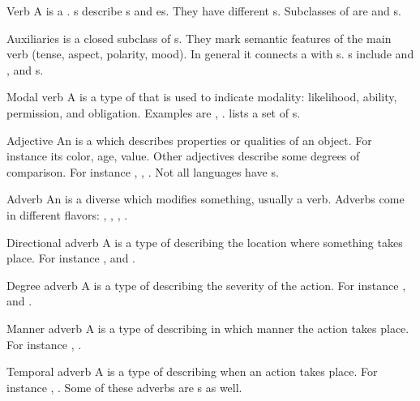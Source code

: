 \begin{df}{Verb}
A \sb{} is a . \sb{}s describe s and es. They have different s. Subclasses of \sb{} are  and s.
\end{df}
\begin{df}{Auxiliaries}
\sb{} is a closed subclass of s. They mark semantic features of the main verb (tense, aspect, polarity, mood). In general it connects a  with s. \sb{}s include  and ,  and s.
\end{df}
\begin{df}{Modal verb}
A \sb{} is a type of  that is used to indicate modality: likelihood, ability, permission, and obligation. Examples are , .  lists a set of \sb{}s.
\end{df}
\begin{df}{Adjective}
An \sb{} is a  which describes properties or qualities of an object. For instance its color, age, value. Other adjectives describe some degrees of comparison. For instance , , . Not all languages have \sb{}s.
\end{df}
\begin{df}{Adverb}
An \sb{} is a diverse  which modifies something, usually a verb. Adverbs come in different flavors: , , , .
\end{df}
\begin{df}{Directional adverb}
A \sb{} is a type of  describing the location where something takes place. For instance ,  and .
\end{df}
\begin{df}{Degree adverb}
A \sb{} is a type of  describing the severity of the action. For instance ,  and .
\end{df}
\begin{df}{Manner adverb}
A \sb{} is a type of  describing in which manner the action takes place. For instance , .
\end{df}
\begin{df}{Temporal adverb}
A \sb{} is a type of  describing when an action takes place. For instance , . Some of these adverbs are s as well.
\end{df}
